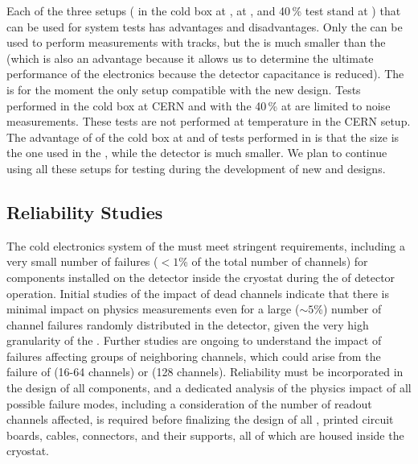 Each of the three setups ( in the cold box at ,   at ,
and \num{40}\,\%  test stand at ) that can be used for system tests has advantages
and disadvantages. Only the   can be used to 
perform measurements with tracks, but the  is 
much smaller than the    (which is also an advantage because it
allows us to determine the ultimate performance of the electronics because
the detector capacitance is reduced). The  
is for the moment the only setup compatible with the new 
design. Tests performed in the cold box at CERN and with the \num{40}\,\%  
at  are limited to noise measurements. These tests are not
performed at  temperature in the CERN setup. The advantage of
of the cold box at  and of tests performed in 
is that the  size is the one used in the  ,
while the  detector is much smaller. We plan to continue
using all these setups for testing during the development of 
new  and  designs.

\subsection{Reliability Studies}
\label{sec:fdsp-tpcelec-qa-reliability}

The  cold electronics system of the    must meet 
stringent requirements, including a very small number of failures ($<\num{1}$\% of the total number of
channels) for components installed 
on the detector inside the cryostat during the \dunelifetime of 
detector operation. Initial studies of the impact of dead channels indicate
that there is minimal impact on physics measurements even for a large ($\sim5$\%) number of 
channel failures randomly distributed in the detector, given the very high granularity of the . 
Further studies are ongoing to understand the impact of failures 
affecting groups of neighboring channels, which could arise from the failure of  
(16-64 channels) or  (128 channels). Reliability must be incorporated in the 
design of all components, and a dedicated analysis of the physics impact of all 
possible failure modes, including a consideration of the number of readout channels
affected, is required before finalizing the design of all , printed circuit 
boards, cables, connectors, and their supports, all of which are housed inside the 
  cryostat. 

